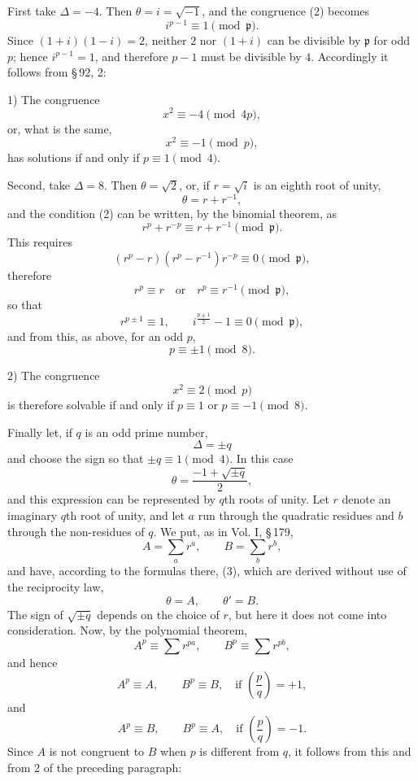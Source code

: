 \documentclass[11pt]{article}
\newcommand{\Jac}[2]{\left(\frac{#1}{#2}\right)}
\begin{document}
First take $\Delta=-4$. Then $\theta=i=\sqrt{-1}$, and the congruence (2) becomes
\[
 i^{p-1}\equiv1\pmod{\mathfrak p}.
\]
Since $(1+i)(1-i)=2$, neither $2$ nor $(1+i)$ can be divisible by $\mathfrak p$ for odd $p$; hence $i^{p-1}=1$, and therefore $p-1$ must be divisible by $4$. Accordingly it follows from \S\,92, 2:

1) The congruence
\[
 x^2\equiv -4\pmod{4p},
\]
or, what is the same,
\[
 x^2\equiv -1\pmod p,
\]
has solutions if and only if $p\equiv1\pmod4$.

Second, take $\Delta=8$. Then $\theta=\sqrt2$, or, if $r=\sqrt i$ is an eighth root of unity,
\[
 \theta=r+r^{-1},
\]
and the condition (2) can be written, by the binomial theorem, as
\[
 r^p+r^{-p}\equiv r+r^{-1}\pmod{\mathfrak p}.
\]
This requires
\[
 (r^p-r)(r^p-r^{-1})r^{-p}\equiv0\pmod{\mathfrak p},
\]
therefore
\[
 r^p\equiv r\quad\text{or}\quad r^p\equiv r^{-1}\pmod{\mathfrak p},
\]
so that
\[
 r^{p\pm1}\equiv1,
 \qquad
 i^{\frac{p\pm1}{2}}-1\equiv0\pmod{\mathfrak p},
\]
and from this, as above, for an odd $p$,
\[
 p\equiv\pm1\pmod8.
\]

2) The congruence
\[
 x^2\equiv2\pmod p
\]
is therefore solvable if and only if $p\equiv1$ or $p\equiv-1\pmod8$.

Finally let, if $q$ is an odd prime number,
\begin{equation}
 \Delta=\pm q
\tag{3}
\end{equation}
and choose the sign so that $\pm q\equiv1\pmod4$. In this case
\[
 \theta=\frac{-1+\sqrt{\pm q}}{2},
\]
and this expression can be represented by $q$th roots of unity. Let $r$ denote an imaginary $q$th root of unity, and let $a$ run through the quadratic residues and $b$ through the non-residues of $q$. We put, as in Vol. I, \S\,179,
\begin{equation}
 A=\sum_a r^a,
 \qquad
 B=\sum_b r^b,
\tag{4}
\end{equation}
and have, according to the formulas there, (3), which are derived without use of the reciprocity law,
\begin{equation}
 \theta=A,
 \qquad
 \theta'=B.
\tag{5}
\end{equation}
The sign of $\sqrt{\pm q}$ depends on the choice of $r$, but here it does not come into consideration. Now, by the polynomial theorem,
\[
 A^p\equiv\sum r^{pa},
 \qquad
 B^p\equiv\sum r^{pb},
\]
and hence
\[
 A^p\equiv A,
 \qquad
 B^p\equiv B,
 \quad \text{if }\Jac{p}{q}=+1,
\]
and
\[
 A^p\equiv B,
 \qquad
 B^p\equiv A,
 \quad \text{if }\Jac{p}{q}=-1.
\]
Since $A$ is not congruent to $B$ when $p$ is different from $q$, it follows from this and from 2 of the preceding paragraph:
\end{document}
